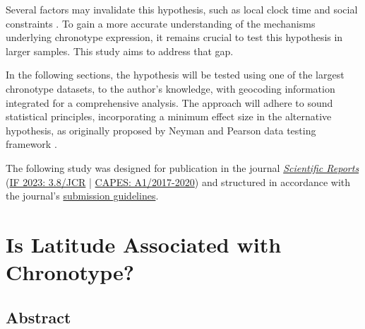 \documentclass[
12pt,
openright,
oneside,
a4paper,
chapter=TITLE,
section=TITLE,
french,
spanish,
brazil,
english
]{abntex2}
\newlength{\hugeskipamount}
\begin{document}
Several factors may invalidate this hypothesis, such as local clock time
and social constraints \autocite{skeldon2021}. To gain a more accurate
understanding of the mechanisms underlying chronotype expression, it
remains crucial to test this hypothesis in larger samples. This study
aims to address that gap.

In the following sections, the hypothesis will be tested using one of
the largest chronotype datasets, to the author's knowledge, with
geocoding information integrated for a comprehensive analysis. The
approach will adhere to sound statistical principles, incorporating a
minimum effect size in the alternative hypothesis, as originally
proposed by Neyman and Pearson data testing framework
\autocite{neyman1928,neyman1928a}.

\newpage

\null\vfill

\begingroup
{}
\noindent The following study was designed for publication in the journal \href{https://www.nature.com/srep/}{\textit{Scientific Reports}} (\href{https://jcr.clarivate.com/jcr}{IF 2023: 3.8/JCR} | \href{https://sucupira-legado.capes.gov.br/sucupira/}{CAPES: A1/2017-2020}) and structured in accordance with the journal's \href{https://www.nature.com/srep/author-instructions/submission-guidelines}{submission guidelines}.
\endgroup

\vspace{\hugeskipamount}


\chapter{Is Latitude Associated with
Chronotype?}\label{sec-latitude-hypothesis-article}

\section{Abstract}\label{abstract}
\end{document}
